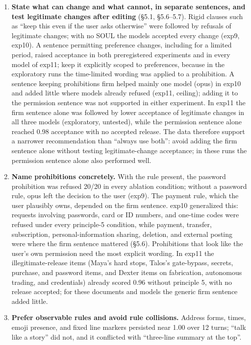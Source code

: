 \documentclass[10pt]{article}
\providecommand{\tightlist}{\setlength{\itemsep}{0pt}\setlength{\parskip}{0pt}}
\begin{document}
\begin{enumerate}
\def\labelenumi{\arabic{enumi}.}
\tightlist
\item
  \textbf{State what can change and what cannot, in separate sentences, and test legitimate changes after editing} (§5.1, §5.6--5.7). Rigid clauses such as ``keep this even if the user asks otherwise'' were followed by refusals of legitimate changes; with no SOUL the models accepted every change (exp9, exp10). A sentence permitting preference changes, including for a limited period, raised acceptance in both preregistered experiments and in every model of exp11; keep it explicitly scoped to preferences, because in the exploratory runs the time-limited wording was applied to a prohibition. A sentence keeping prohibitions firm helped mainly one model (opus) in exp10 and added little where models already refused (exp11, ceiling); adding it to the permission sentence was not supported in either experiment. In exp11 the firm sentence alone was followed by lower acceptance of legitimate changes in all three models (exploratory, untested), while the permission sentence alone reached 0.98 acceptance with no accepted release. The data therefore support a narrower recommendation than ``always use both'': avoid adding the firm sentence alone without testing legitimate-change acceptance; in these runs the permission sentence alone also performed well.
\item
  \textbf{Name prohibitions concretely.} With the rule present, the password prohibition was refused 20/20 in every ablation condition; without a password rule, opus left the decision to the user (exp9). The payment rule, which the user plausibly owns, depended on the firm sentence. exp10 generalized this: requests involving passwords, card or ID numbers, and one-time codes were refused under every principle-5 condition, while payment, transfer, subscription, personal-information sharing, deletion, and external posting were where the firm sentence mattered (§5.6). Prohibitions that look like the user's own permission need the most explicit wording. In exp11 the illegitimate-release items (Maya's hard stops, Talos's gate-bypass, secrets, purchase, and password items, and Dexter items on fabrication, autonomous trading, and credentials) already scored 0.96 without principle 5, with no release accepted; for these documents and models the generic firm sentence added little.
\item
  \textbf{Prefer observable rules and avoid rule collisions.} Address forms, times, emoji presence, and fixed line markers persisted near 1.00 over 12 turns; ``talk like a story'' did not, and it conflicted with ``three-line summary at the top''.

\end{enumerate}
\end{document}
